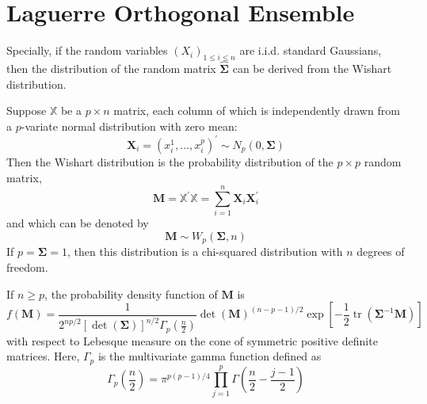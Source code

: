 \section{Laguerre Orthogonal Ensemble}

Specially, if the random variables $\left(X_{i}\right)_{1\leq i\leq n}$ are i.i.d. standard Gaussians, then the distribution of the random matrix $\widehat{\boldsymbol{\Sigma}}$ can be derived from the Wishart distribution.

\begin{definition}
    Suppose $\mathbb{X}$ be a $p\times n$ matrix, each column of which is independently drawn from a $p$-variate normal distribution with zero mean:
    \begin{equation*}
        \mathbf{X}_{i}=\left(x_{i}^{1},\ldots,x_{i}^{p}\right)^{\prime}\sim N_{p}(0,\boldsymbol{\Sigma})
    \end{equation*}
    Then the Wishart distribution is the probability distribution of the $p\times p$ random matrix,
    \begin{equation}
        \mathbf{M}=\mathbb{X}^{\prime}\mathbb{X}=\sum_{i=1}^{n}\mathbf{X}_{i}\mathbf{X}_{i}^{\prime}
    \end{equation}
    and which can be denoted by
    \begin{equation*}
        \mathbf{M}\sim W_{p}\left(\boldsymbol{\Sigma},n\right)
    \end{equation*}
    If $p=\boldsymbol{\Sigma}=1$, then this distribution is a chi-squared distribution with $n$ degrees of freedom.
\end{definition}

\begin{note}
    If $n\geq p$, the probability density function of $\mathbf{M}$ is
    \begin{equation}
        f\left(\mathbf{M}\right)=\frac{1}{2^{np/2}\left[\operatorname{det}\left(\boldsymbol{\Sigma}\right)\right]^{n/2}\Gamma_{p}\left(\frac{n}{2}\right)}\operatorname{det}\left(\mathbf{M}\right)^{(n-p-1)/2}\exp\left[-\frac{1}{2}\operatorname{tr}\left(\boldsymbol{\Sigma}^{-1}\mathbf{M}\right)\right]
        \label{eq:pdf-wishart}
    \end{equation}
    with respect to Lebesque measure on the cone of symmetric positive definite matrices. Here, $\Gamma_{p}$ is the multivariate gamma function defined as
    \begin{equation*}
        \Gamma_{p}\left(\frac{n}{2}\right)=\pi^{p(p-1)/4}\prod_{j=1}^{p}\Gamma\left(\frac{n}{2}-\frac{j-1}{2}\right)
    \end{equation*}
\end{note}

